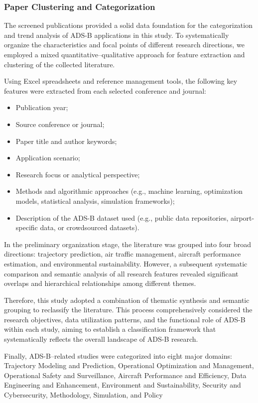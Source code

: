 \subsubsection{Paper Clustering and Categorization}

The screened publications provided a solid data foundation for the categorization and trend analysis of ADS-B applications in this study. To systematically organize the characteristics and focal points of different research directions, we employed a mixed quantitative–qualitative approach for feature extraction and clustering of the collected literature.

Using Excel spreadsheets and reference management tools, the following key features were extracted from each selected conference and journal:
\begin{itemize}
    \item Publication year;
    \item Source conference or journal;
    \item Paper title and author keywords;
    \item Application scenario;
    \item Research focus or analytical perspective;
    \item Methods and algorithmic approaches (e.g., machine learning, optimization models, statistical analysis, simulation frameworks);
    \item Description of the ADS-B dataset used (e.g., public data repositories, airport-specific data, or crowdsourced datasets).
\end{itemize}

In the preliminary organization stage, the literature was grouped into four broad directions: trajectory prediction, air traffic management, aircraft performance estimation, and environmental sustainability. However, a subsequent systematic comparison and semantic analysis of all research features revealed significant overlaps and hierarchical relationships among different themes.

Therefore, this study adopted a combination of thematic synthesis and semantic grouping to reclassify the literature. This process comprehensively considered the research objectives, data utilization patterns, and the functional role of ADS-B within each study, aiming to establish a classification framework that systematically reflects the overall landscape of ADS-B research.

Finally, ADS-B–related studies were categorized into eight major domains:
Trajectory Modeling and Prediction, Operational Optimization and Management, Operational Safety and Surveillance, Aircraft Performance and Efficiency, Data Engineering and Enhancement, Environment and Sustainability, Security and Cybersecurity, Methodology, Simulation, and Policy

